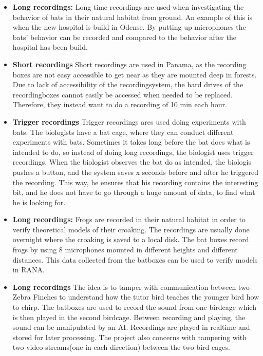 \begin{itemize}
	\item \textbf{Long recordings:} Long time recordings are used when investigating the behavior of bats in their natural habitat from ground. An example of this is when the new hospital is build in Odense. By putting up microphones the bats’ behavior can be recorded and compared to the behavior after the hospital has been build.
	
	 \item \textbf{Short recordings} Short recordings are used in Panama, as the recording boxes are not easy accessible to get near as they are mounted deep in forests. Due to lack of accessibility of the recordingsystem, the hard drives of the recordingboxes cannot easily be accessed when needed to be replaced. Therefore, they instead want to do a recording of 10 min each hour.

	\item \textbf{Trigger recordings} Trigger recordings ares used doing experiments with bats. The biologists have a bat cage, where they can conduct different experiments with bats. Sometimes it takes long before the bat does what is intended to do, so instead of doing long recordings, the biologist uses trigger recordings. When the biologist observes the bat do as intended, the biologis pushes a button, and the system saves x seconds before and after he triggered the recording. This way, he ensures that his recording contains the interesting bit, and he does not have to go through a huge amount of data, to find what he is looking for.
\end{itemize}






\begin{itemize}
	\item \textbf{Long recordings:} Frogs are recorded in their natural habitat in order to verify theoretical models of their croaking. The recordings are usually done overnight where the croaking is saved to a local disk. The bat boxes record frogs by using 8 microphones mounted in different heights and different distances. This data collected from the batboxes can be used to verify models in RANA.
\end{itemize}


\begin{itemize}
	\item \textbf{Long recordings} The idea is to tamper with communication between two Zebra Finches to understand how the tutor bird teaches the younger bird how to chirp. The batboxes are used to record the sound from one birdcage which is then played in the second birdcage. Between recording and playing, the sound can be manipulated by an AI. Recordings are played in realtime and stored for later processing. The project also concerns with tampering with two video streams(one in each direction) between the two bird cages. 
\end{itemize}


